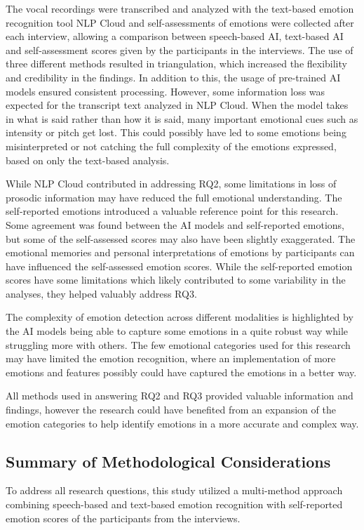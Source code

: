 The vocal recordings were transcribed and analyzed with the text-based emotion recognition tool NLP Cloud and self-assessments of emotions were collected after each interview, allowing a comparison between speech-based AI, text-based AI and self-assessment scores given by the participants in the interviews. 
The use of three different methods resulted in triangulation, which increased the flexibility and credibility in the findings. In addition to this, the usage of pre-trained AI models ensured consistent processing. However, some information loss was expected for the transcript text analyzed in NLP Cloud. When the model takes in what is said rather than how it is said, many important emotional cues such as intensity or pitch get lost. This could possibly have led to some emotions being misinterpreted or not catching the full complexity of the emotions expressed, based on only the text-based analysis.

While NLP Cloud contributed in addressing RQ2, some limitations in loss of prosodic information may have reduced the full emotional understanding.
The self-reported emotions introduced a valuable reference point for this research. Some agreement was found between the AI models and self-reported emotions, but some of the self-assessed scores may also have been slightly exaggerated. The emotional memories and personal interpretations of emotions by participants can have influenced the self-assessed emotion scores.
While the self-reported emotion scores have some limitations which likely contributed to some variability in the analyses, they helped valuably address RQ3.

The complexity of emotion detection across different modalities is highlighted by the AI models being able to capture some emotions in a quite robust way while struggling more with others. The few emotional categories used for this research may have limited the emotion recognition, where an implementation of more emotions and features possibly could have captured the emotions in a better way.

All methods used in answering RQ2 and RQ3 provided valuable information and findings, however the research could have benefited from an expansion of the emotion categories to help identify emotions in a more accurate and complex way.

\subsection{Summary of Methodological Considerations}
To address all research questions, this study utilized a multi-method approach combining speech-based and text-based emotion recognition with self-reported emotion scores of the participants from the interviews. 

